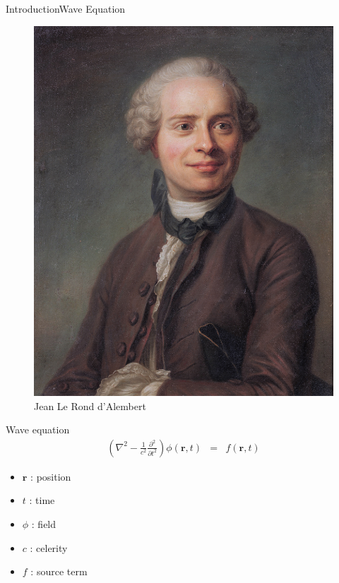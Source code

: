 \documentclass[9pt, xcolor={usenames, dvipsnames}]{beamer}
\begin{document}
				\begin{frame}{Introduction}{Wave Equation}
					\centering
					\begin{minipage}[t]{0.3\textwidth}
						\begin{figure}
							\includegraphics[width=\textwidth]{images/profile/Jean_Le_Rond_d'Alembert,_by_French_school.jpg}
							\caption{Jean Le Rond d'Alembert}
						\end{figure}
					\end{minipage}
					\hfill
					\begin{minipage}[t]{0.6\textwidth}
						\begin{alertblock}{Wave equation}
							\begin{eqnarray}
								\left(\nabla^2 - \frac{1}{c^2} \frac{\partial^2}{\partial t^2} \right) \phi(\mathbf{r}, t) & = & f(\mathbf{r}, t) \label{equation:alembert}
							\end{eqnarray}
							\begin{itemize}
								\item $\mathbf{r}$ : position
								\item $t$ : time
								\item $\phi$ : field
								\item $c$ : celerity 
								\item $f$ : source term
							\end{itemize}
						\end{alertblock}
					\end{minipage}
				\end{frame}
\end{document}
